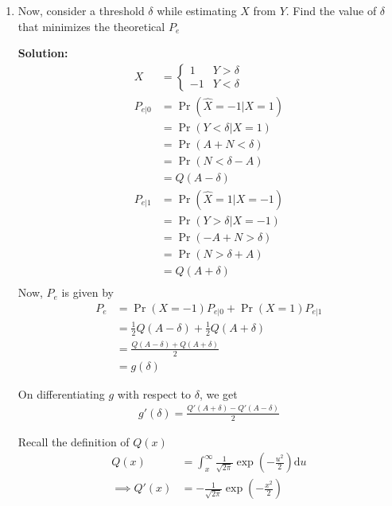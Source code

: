 \documentclass[journal,12pt,twocolumn]{IEEEtran}
\newcommand{\solution}{\noindent \textbf{Solution: }}
\providecommand{\pr}[1]{\ensuremath{\Pr\left(#1\right)}}
\providecommand{\brak}[1]{\ensuremath{\left(#1\right)}}
\providecommand{\der}[1]{\mathrm{d} #1}
\numberwithin{equation}{section}
\renewcommand\thesection{\arabic{section}}
\begin{document}
\begin{enumerate}[label=\thesection.\arabic*,ref=\thesection.\theenumi]
	\item Now, consider a threshold $\delta$  while estimating $X$ from $Y$. Find the value of $\delta$ that minimizes the theoretical $P_e$
	
	\solution 
	\begin{align}
		X &= 
		\begin{cases}
			1 & Y > \delta \\
			-1 & Y < \delta
		\end{cases} \\
		P_{e|0} &= \pr{\hat{X} = -1|X=1} \\
		&= \pr{Y<\delta | X=1} \\
		&= \pr{A+N < \delta} \\
		&= \pr{N < \delta - A} \\
		&= Q(A - \delta) \\
		P_{e|1} &= \pr{\hat{X} = 1|X=-1} \\
		&= \pr{Y>\delta | X=-1} \\
		&= \pr{-A+N > \delta} \\
		&= \pr{N > \delta + A} \\
		&= Q(A + \delta) \\
	\end{align}
	Now, $P_e$ is given by
	\begin{align}
		P_e &= \pr{X=-1} P_{e|0} + \pr{X=1} P_{e|1} \\
		&= \frac12 Q(A - \delta) + \frac12 Q(A + \delta) \\
		&= \frac{Q(A - \delta) + Q(A + \delta)}{2} \\
		&= g(\delta) 
	\end{align}
	
	On differentiating $g$ with respect to $\delta$, we get
	\begin{align}
		g'(\delta) = \frac{Q'(A + \delta) - Q'(A - \delta)}{2}
	\end{align}
	
	Recall the definition of $Q(x)$
	\begin{align}
		Q(x) &= \int_x^\infty \frac{1}{\sqrt{2\pi}} \exp\brak{-\frac{u^2}{2}} \der{u} \\
		\implies Q'(x) &= - \frac{1}{\sqrt{2\pi}} \exp\brak{-\frac{x^2}{2}}
	\end{align}
	

\end{enumerate}
\end{document}
